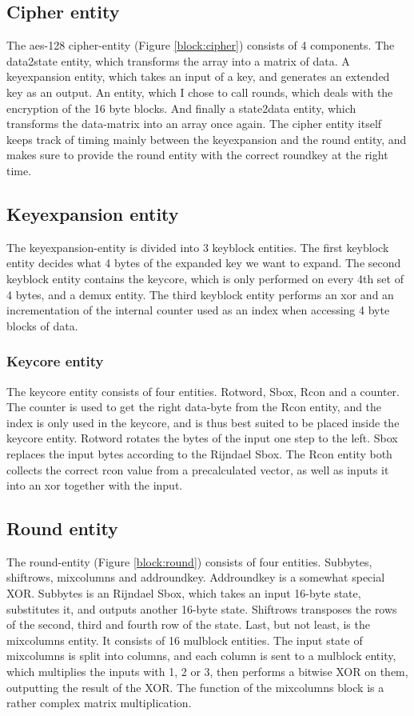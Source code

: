 \subsection{Cipher entity}
The aes-128 cipher-entity (Figure \ref{block:cipher}) consists of 4 
components. The data2state entity, which transforms the array into a 
matrix of data. A keyexpansion entity, which takes an input of a key, 
and generates an extended key as an output. An entity, which I chose to 
call rounds, which deals with the encryption of the 16 byte blocks. And 
finally a state2data entity, which transforms the data-matrix into an 
array once again. The cipher entity itself keeps track of timing mainly 
between the keyexpansion and the round entity, and makes sure to 
provide the round entity with the correct roundkey at the right time.

\subsection{Keyexpansion entity}
The keyexpansion-entity is divided into 3 keyblock entities. The first 
keyblock entity decides what 4 bytes of the expanded key we want to 
expand. The second keyblock entity contains the keycore, which is only 
performed on every 4th set of 4 bytes, and a demux entity. The third 
keyblock entity performs an xor and an incrementation of the internal 
counter used as an index when accessing 4 byte blocks of data.

\subsubsection{Keycore entity}
The keycore entity consists of four entities. Rotword, Sbox, Rcon and a 
counter. The counter is used to get the right data-byte from the Rcon 
entity, and the index is only used in the keycore, and is thus best 
suited to be placed inside the keycore entity. Rotword rotates the 
bytes of the input one step to the left. Sbox replaces the input bytes 
according to the Rijndael Sbox. The Rcon entity both collects the 
correct rcon value from a precalculated vector, as well as inputs it 
into an xor together with the input.

\subsection{Round entity}
The round-entity (Figure \ref{block:round}) consists of four entities. Subbytes, 
shiftrows, mixcolumns and addroundkey. Addroundkey is a somewhat special XOR. 
Subbytes is an Rijndael Sbox, which takes an input 16-byte state, substitutes 
it, and outputs another 16-byte state. Shiftrows transposes the rows of the 
second, third and fourth row of the state. Last, but not least, is the 
mixcolumns entity. It consists of 16 mulblock entities. The input state of 
mixcolumns is split into columns, and each column is sent to a mulblock entity, 
which multiplies the inputs with 1, 2 or 3, then performs a bitwise XOR on them, 
outputting the result of the XOR. The function of the mixcolumns block is a 
rather complex matrix multiplication.

